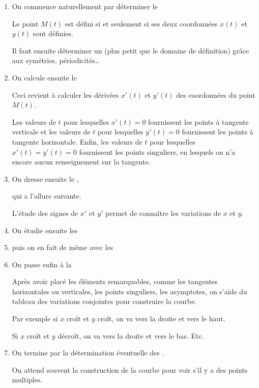 \begin{enumerate}
\item On commence naturellement par déterminer 
le 

Le point $M(t)$ est défini si et seulement 
si ses deux coordonnées $x(t)$ et $y(t)$ sont définies.


Il faut ensuite déterminer un  
(plus petit que le domaine de définition) 
grâce aux symétries, périodicités\ldots 

\change

\item On calcule ensuite le  

Ceci revient à calculer les dérivées 
$x'(t)$ et $y'(t)$ des coordonnées du point $M(t)$.

Les valeurs de $t$ pour lesquelles $x'(t)=0$ 
fournissent les points à tangente verticale et les valeurs de 
$t$ pour lesquelles $y'(t)=0$ fournissent les 
points à tangente horizontale. Enfin, les valeurs de $t$ pour 
lesquelles $x'(t)=y'(t)=0$ fournissent les points singuliers, 
en lesquels on n'a encore aucun renseignement sur la tangente.

\change

\item On dresse ensuite le 
, 

\change
qui a l'allure suivante. 

L'étude des signes de $x'$ et $y'$ permet de 
connaître les variations de $x$ et $y$.

\change

\item  On étudie ensuite les  

\change

\item puis on en fait de même avec les 

\change

\item On passe enfin à la 

Après avoir placé les éléments remarquables, 
comme les tangentes horizontales ou verticales, 
les points singuliers, les asymptotes, 
on s'aide du tableau des variations conjointes 
pour construire la courbe.

\change
Par exemple si $x$ croît et $y$ croît,
on va vers la droite et vers le haut.


\change
Si $x$ croît et $y$ décroît, on va vers la droite et vers le bas.
Etc.

\change

\item On termine par la détermination éventuelle 
des .

On attend souvent la construction de la courbe pour 
voir s'il y a des points multiples.

\end{enumerate}




